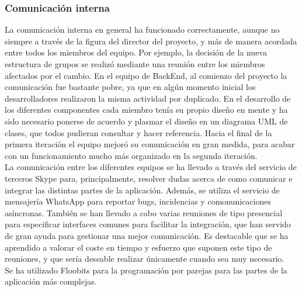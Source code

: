\subsubsection{Comunicación interna}
La comunicación interna en general ha funcionado correctamente, aunque no siempre a través de la figura del director del proyecto, y más de manera acordada entre todos los miembros del equipo. Por ejemplo, la decisión de la nueva estructura de grupos se realizó mediante una reunión entre los miembros afectados por el cambio.
En el equipo de BackEnd, al comienzo del proyecto la comunicación fue bastante pobre, ya que en algún momento inicial los desarrolladores realizaron la misma actividad por duplicado. En el desarrollo de los diferentes componentes cada miembro tenía su propio diseño en mente y ha sido necesario ponerse de acuerdo y plasmar el diseño en un diagrama UML de clases, que todos pudieran consultar y hacer referencia. Hacia el final de la primera iteración el equipo mejoró su comunicación en gran medida, para acabar con un funcionamiento mucho más organizado en la segunda iteración.
\\
La comunicación entre los diferentes equipos se ha llevado a través del servicio de terceros Skype para, principalmente, resolver dudas acerca de como comunicar e integrar las distintas partes de la aplicación. Además, se utiliza el servicio de mensajería WhatsApp para reportar bugs, incidencias y comonunicaciones asíncronas. También se han llevado a cabo varias reuniones de tipo presencial para especificar interfaces comunes para facilitar la integración, que han servido de gran ayuda para gestionar una mejor comunicación. Es destacable que se ha aprendido a valorar el coste en tiempo y esfuerzo que suponen este tipo de reuniones, y que sería deseable realizar únicamente cuando sea muy necesario.
\\
Se ha utilizado Floobits para la programación por parejas para las partes de la aplicación más complejas.

